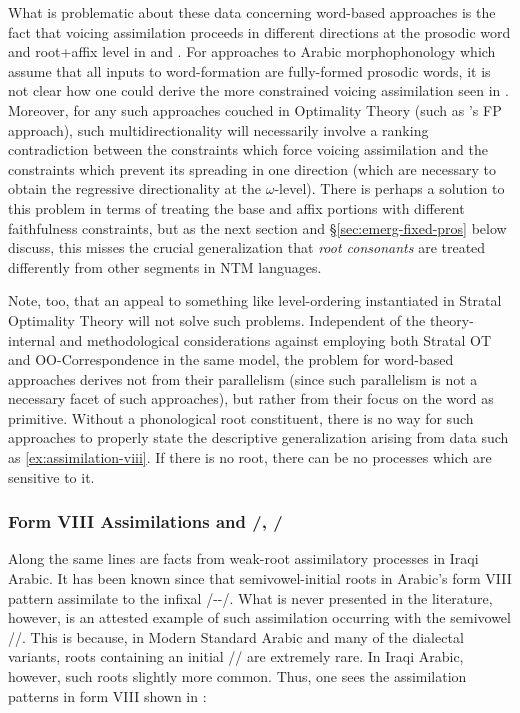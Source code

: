 \documentclass[12pt,twoside,letterpaper]{article}
\begin{document}
What is problematic about these data concerning word-based approaches is the fact that voicing assimilation proceeds in different directions at the prosodic word and root+affix level in \LLast and \Last. For approaches to Arabic morphophonology which assume that all inputs to word-formation are fully-formed prosodic words, it is not clear how one could derive the more constrained voicing assimilation seen in \Last. Moreover, for any such approaches couched in Optimality Theory (such as \cite{ussishkin99,ussishkin00,ussishkin05}'s FP approach), such multidirectionality will necessarily involve a ranking contradiction between the constraints which force voicing assimilation and the constraints which prevent its spreading in one direction (which are necessary to obtain the regressive directionality at the $\omega$-level). There is perhaps a solution to this problem in terms of treating the base and affix portions with different faithfulness constraints, but as the next section and \S{\ref{sec:emerg-fixed-pros}} below discuss, this misses the crucial generalization that \emph{root consonants} are treated differently from other segments in NTM languages.

Note, too, that an appeal to something like level-ordering instantiated in Stratal Optimality Theory \citep{kiparsky00} will not solve such problems. Independent of the theory-internal and methodological considerations against employing both Stratal OT and OO-Correspondence in the same model, the problem for word-based approaches derives not from their parallelism (since such parallelism is not a necessary facet of such approaches), but rather from their focus on the word as primitive. Without a phonological root constituent, there is no way for such approaches to properly state the descriptive generalization arising from data such as \ref{ex:assimilation-viii}. If there is no root, there can be no processes which are sensitive to it.

\subsubsection{Form VIII Assimilations and /, /}
\label{sec:form-viii-assim}

Along the same lines are facts from weak-root assimilatory processes in Iraqi Arabic. It has been known since \cite{mccarthy79,mccarthy81} that semivowel-initial roots in Arabic's form VIII {\em {}} pattern assimilate to the infixal /--/. What is never presented in the literature, however, is an attested example of such assimilation occurring with the semivowel //. This is because, in Modern Standard Arabic and many of the dialectal variants, roots containing an initial // are extremely rare. In Iraqi Arabic, however, such roots slightly more common. Thus, one sees the assimilation patterns in form VIII shown in \Next:
\end{document}

